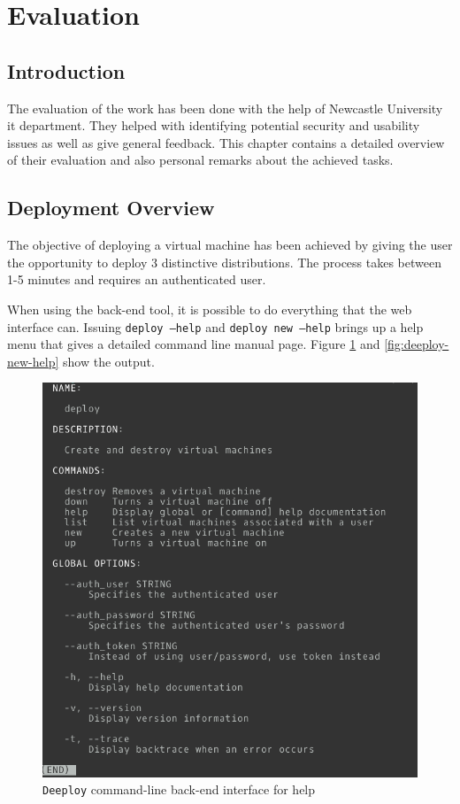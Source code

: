 \documentclass{article}
\begin{document}
\newpage
\section{Evaluation}

\subsection{Introduction}
The evaluation of the work has been done with the help of Newcastle University \gls{it} department. They helped with identifying potential security and usability issues as well as give general feedback. This chapter contains a detailed overview of their evaluation and also personal remarks about the achieved tasks.

\subsection{Deployment Overview}
The objective of deploying a virtual machine has been achieved by giving the user the opportunity to deploy 3 distinctive distributions. The process takes between 1-5 minutes and requires an authenticated user.

When using the back-end tool, it is possible to do everything that the web interface can. Issuing \texttt{deploy --help} and \texttt{deploy new --help} brings up a help menu that gives a detailed command line manual page. Figure \ref{fig:deeploy-help} and \ref{fig:deeploy-new-help} show the output.

\begin{figure}[h!]
	\vspace{0.5cm}
	\includegraphics[width=12cm]{deeploy_help_cli}
	\vspace{0.5cm}
	\caption{\texttt{Deeploy} command-line back-end interface for help}
	\label{fig:deeploy-help}
\end{figure}
\end{document}
